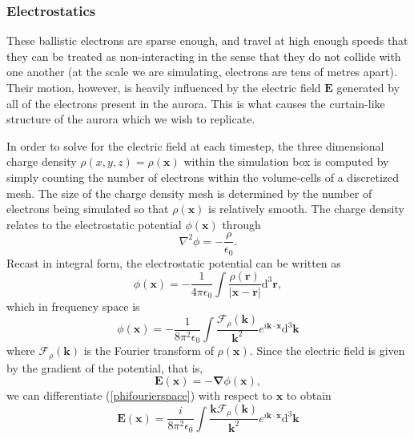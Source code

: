 \documentclass[twocolumn]{article}
\renewcommand{\vec}[1]{\mathbf{#1} }
\begin{document}
\subsubsection*{Electrostatics}
These ballistic electrons are sparse enough, and travel at high enough speeds that they can be treated as non-interacting in the sense that they do not collide with one another (at the scale we are simulating, electrons are tens of metres apart). Their motion, however, is heavily influenced by the electric field $\vec E$ generated by all of the electrons present in the aurora. This is what causes the curtain-like structure of the aurora which we wish to replicate.

In order to solve for the electric field at each timestep, the three dimensional charge density $\rho(x,y,z) = \rho(\vec x)$ within the simulation box is computed by simply counting the number of electrons within the volume-cells of a discretized mesh.  The size of the charge density mesh is determined by the  number of electrons being simulated so that $\rho(\vec x)$ is relatively smooth.  The charge density relates to the electrostatic potential $\phi(\vec x)$ through
\begin{equation}
\nabla ^ 2 \phi  = -\frac{\rho}{\epsilon_0}.
\end{equation}
Recast in integral form, the electrostatic potential can be written as \cite{griffiths_ED}
\begin{equation}
\phi(\vec x) = -\frac{1}{4\pi\epsilon_0}\int{\frac{\rho(\vec r) }{\left| \vec x - \vec r \right| } \mathrm{d} ^3\vec r},
\end{equation}
which in frequency space is
\begin{equation}\label{phifourierspace}
\phi(\vec x)  = -\frac{1}{8\pi^2\epsilon_0}\int{ \frac{\mathcal{F}_\rho (\vec k)}{\vec k^2}e^{i\vec k\cdot\vec x }\mathrm{d}^3\vec k    }
\end{equation}
where
$\mathcal{F}_\rho (\vec k)$ is the Fourier transform of $\rho(\vec x)$.  Since the electric field is given by the gradient of the potential, that is,
\begin{equation}
\vec E(\vec x) = -\vec\nabla \phi(\vec x),
\end{equation}
we can differentiate (\ref{phifourierspace}) with respect to $\vec x$ to obtain
\begin{equation}\label{EfieldFourierSpace}
\vec E (\vec x) = \frac{i}{8\pi^2\epsilon_0}\int{   \frac{\vec k \mathcal{F}_\rho (\vec k)}{\vec k ^ 2}e^{i\vec k\cdot\vec x }\mathrm{d}^3\vec k }
\end{equation}
\end{document}
